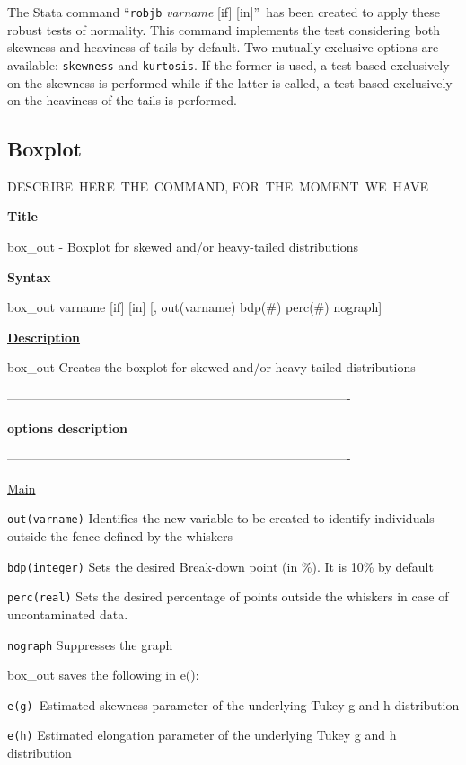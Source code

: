 The Stata command \textquotedblleft\texttt{robjb} \textit{varname} [if]
[in]\textquotedblright\ has been created to apply these robust tests of
normality. This command implements the test considering both skewness and
heaviness of tails by default. Two mutually exclusive options are available:
\texttt{skewness} and \texttt{kurtosis}. If the former is used, a test based
exclusively on the skewness is performed while if the latter is called, a test
based exclusively on the heaviness of the tails is performed.

\subsection{Boxplot}

DESCRIBE\ HERE\ THE\ COMMAND, FOR\ THE\ MOMENT\ WE\ HAVE

\bigskip

\textbf{Title}

box\_out - Boxplot for skewed and/or heavy-tailed distributions

\textbf{Syntax}

box\_out varname [if] [in] [, out(varname) bdp(\#) perc(\#) nograph]

\underline{\textbf{Description}}

box\_out Creates the boxplot for skewed and/or heavy-tailed distributions

----------------------------------------------------------------------------------

\textbf{options description}

----------------------------------------------------------------------------------

\underline{Main} \smallskip

\texttt{out(varname)} Identifies the new variable to be created to identify
individuals outside the fence defined by the whiskers

\texttt{bdp(integer)} Sets the desired Break-down point (in \%). It is 10\% by default

\texttt{perc(real)} Sets the desired percentage of points outside the whiskers
in case of uncontaminated data.

\texttt{nograph} Suppresses the graph

box\_out saves the following in e():

\texttt{e(g) }Estimated skewness parameter of the underlying Tukey g and h distribution

\texttt{e(h)} Estimated elongation parameter of the underlying Tukey g and h distribution

